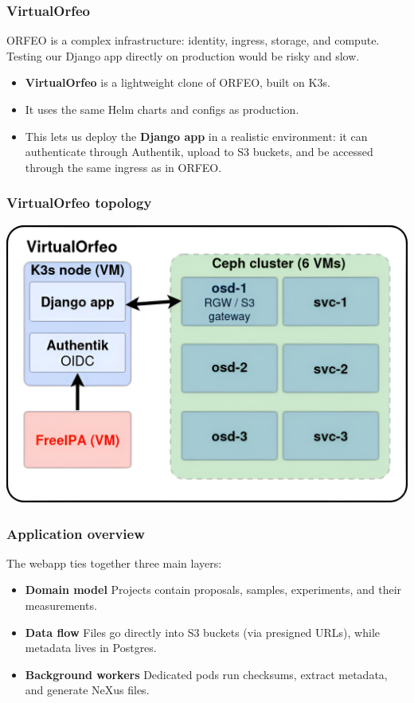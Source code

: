 \documentclass{beamer}
\begin{document}
	\begin{frame}
		\frametitle{VirtualOrfeo}
		
		ORFEO is a complex infrastructure: identity, ingress, storage, and compute.  
		Testing our Django app directly on production would be risky and slow.
		
		\vspace{1em}
		\begin{itemize}
			\item \textbf{VirtualOrfeo} is a lightweight clone of ORFEO, built on K3s.
			\item It uses the same Helm charts and configs as production.
			\item This lets us deploy the \textbf{Django app} in a realistic environment:
			it can authenticate through Authentik, upload to S3 buckets,
			and be accessed through the same ingress as in ORFEO.
		\end{itemize}
	\end{frame}
	
	\begin{frame}
		\frametitle{VirtualOrfeo topology}
		\includegraphics[width=\textwidth]{otherResources/VirtualOrfeo_topology.png}
	\end{frame}
	
	
	\begin{frame}
		\frametitle{Application overview}
		
		The webapp ties together three main layers:
		
		\vspace{0.8em}
		\begin{itemize}
			\item \textbf{Domain model}  
			Projects contain proposals, samples, experiments, and their measurements.
			
			\item \textbf{Data flow}  
			Files go directly into S3 buckets (via presigned URLs), 
			while metadata lives in Postgres.
			
			\item \textbf{Background workers}  
			Dedicated pods run checksums, extract metadata, and generate NeXus files.
		\end{itemize}
	\end{frame}
	
\end{document}
